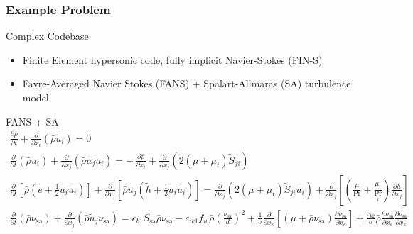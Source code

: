 \documentclass[mathserif]{beamer}
\newcommand{\pp}[2]{\frac{\partial #1}{\partial #2}}
\newcommand{\sa}{\nu_{\mathrm{sa}}}
\begin{document}
\begin{frame}
 \frametitle{Example Problem}

 \begin{block}{Complex Codebase}
  \begin{itemize}
   \item Finite Element hypersonic code, fully implicit Navier-Stokes (FIN-S)
   \item Favre-Averaged Navier Stokes (FANS) + Spalart-Allmaras (SA)
	 turbulence model
  \end{itemize}
 \end{block}

  \begin{block}{FANS + SA}
  \tiny
  \begin{gather*}
   \pp{\bar{\rho}}{t} + \pp{}{x_i} (\bar{\rho}\tilde{u}_i) = 0 \\
   \pp{}{t} \left(\bar{\rho} \tilde{u}_i \right) + \pp{}{x_j}
   \left(\bar{\rho} \tilde{u}_j \tilde{u}_i  \right) = - \,
   \pp{\bar{p}}{x_i} + \pp{}{x_j}\left( 2 (\mu + \mu_t) \tilde{S}_{ji}
   \right) \\ 
   \pp{}{t} \left[ \bar{\rho} \left( \tilde{e} + \frac{1}{2} \tilde{u}_i
   \tilde{u}_i \right) \right] + \pp{}{x_j} \left[ \bar{\rho} \tilde{u}_j
   \left( \tilde{h} + \frac{1}{2} \tilde{u}_i \tilde{u}_i \right) \right]
   =  \pp{}{x_j} \left( 2 (\mu + \mu_t) \tilde{S}_{ji} \tilde{u}_i \right)
   + \pp{}{x_j} \left[ \left( \frac{\mu}{\Pr} + \frac{\mu_t}{\Pr_t}
   \right) \pp{\tilde{h}}{x_j} \right] \\ 
   \pp{}{t}(\bar{\rho} \sa) + \pp{}{x_j} (\bar{\rho} \tilde{u}_j \sa) =
   c_{b1} S_{\mathrm{sa}} \bar{\rho} \sa - c_{w1} f_w \bar{\rho} \left(
   \frac{\sa}{d} \right)^2 + \frac{1}{\sigma} \pp{}{x_k} \left[ (\mu +
   \bar{\rho} \sa) \pp{\sa}{x_k} \right] + \frac{c_{b2}}{\sigma}
   \bar{\rho} \pp{\sa}{x_k} \pp{\sa}{x_k}
  \end{gather*}
\end{block}
\end{frame}


\end{document}
